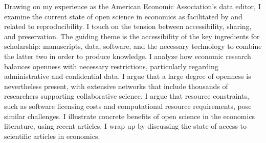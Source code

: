 Drawing on my experience as the American Economic Association's  data editor, I examine the current state of open science in economics as
facilitated by and related to reproducibility. I  touch on the tension between
accessibility, sharing, and preservation. The guiding theme is the accessibility of the key ingredients for scholarship: manuscripts, data, software, and the
necessary technology to combine the latter two in order to produce knowledge.
I analyze how economic research balances openness with necessary restrictions, particularly regarding administrative and confidential data.  I  argue that a large degree of openness is nevertheless present, with extensive networks that include thousands of researchers supporting collaborative science. I  argue that resource constraints, such as software licensing costs and computational resource requirements, pose similar challenges. I  illustrate concrete benefits of open science in the economics literature, using recent articles. I wrap up by discussing the state of access to scientific articles in economics. 
